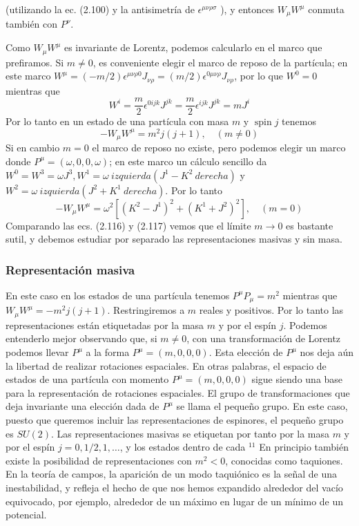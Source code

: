 {      (utilizando la ec. (2.100) y la antisimetría de $\epsilon^{\mu \nu \rho \sigma}$ ), y entonces $W_{\mu} W^{\mu}$ conmuta también con $P^{\nu}$.

Como $W_{\mu} W^{\mu}$ es invariante de Lorentz, podemos calcularlo en el marco que prefiramos. Si $m \neq 0$, es conveniente elegir el marco de reposo de la partícula; en este marco $W^{\mu}=(-m / 2) \epsilon^{\mu \nu \rho 0} J_{\nu \rho}=(m / 2) \epsilon^{0 \mu \nu \rho} J_{\nu \rho}$, por lo que $W^{0}=0$ mientras que
\begin{equation*}
  W^{i}=\frac{m}{2} \epsilon^{0 i j k} J^{j k}=\frac{m}{2} \epsilon^{i j k} J^{j k}=m J^{i} \tag{2.115}
  \end{equation*}
  Por lo tanto en un estado de una partícula con masa $m$ y $\operatorname{spin} j$ tenemos
  \begin{equation*}
    -W_{\mu} W^{\mu}=m^{2} j(j+1), \quad(m \neq 0) \tag{2.116}
    \end{equation*}
    Si en cambio $m=0$ el marco de reposo no existe, pero podemos elegir un marco donde $P^{\mu}=(\omega, 0,0, \omega)$; en este marco un cálculo sencillo da $W^{0}=W^{3}=\omega J^{3}, W^{1}=\omega\ izquierda(J^{1}-K^{2}\ derecha)$ y $W^{2}=\omega\ izquierda(J^{2}+K^{1}\ derecha)$. Por lo tanto
    \begin{equation*}
      -W_{\mu} W^{\mu}=\omega^{2}\left[\left(K^{2}-J^{1}\right)^{2}+\left(K^{1}+J^{2}\right)^{2}\right], \quad(m=0) \tag{2.117}
      \end{equation*}
      Comparando las ecs. (2.116) y (2.117) vemos que el límite $m \rightarrow 0$ es bastante sutil, y debemos estudiar por separado las representaciones masivas y sin masa.
  \subsubsection{Representación masiva}
  En este caso en los estados de una partícula tenemos $P^{\mu} P_{\mu}=m^{2}$ mientras que $W_{\mu} W^{\mu}=-m^{2} j(j+1)$. Restringiremos a $m$ reales y positivos. Por lo tanto las representaciones están etiquetadas por la masa $m$ y por el espín $j$. Podemos entenderlo mejor observando que, si $m \neq 0$, con una transformación de Lorentz podemos llevar $P^{\mu}$ a la forma $P^{\mu}=(m, 0,0,0)$. Esta elección de $P^{\mu}$ nos deja aún la libertad de realizar rotaciones espaciales. En otras palabras, el espacio de estados de una partícula con momento $P^{\mu}=(m, 0,0,0)$ sigue siendo una base para la representación de rotaciones espaciales. El grupo de transformaciones que deja invariante una elección dada de $P^{\mu}$ se llama el pequeño grupo. En este caso, puesto que queremos incluir las representaciones de espinores, el pequeño grupo es $S U(2)$. Las representaciones masivas se etiquetan por tanto por la masa $m$ y por el espín $j=0,1 / 2,1, \ldots$, y los estados dentro de cada ${ }^{11}$ En principio también existe la posibilidad de representaciones con $m^{2}<0$, conocidas como taquiones. En la teoría de campos, la aparición de un modo taquiónico es la señal de una inestabilidad, y refleja el hecho de que nos hemos expandido alrededor del vacío equivocado, por ejemplo, alrededor de un máximo en lugar de un mínimo de un potencial.

}
